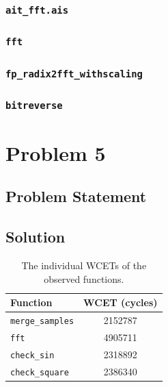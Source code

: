 \documentclass[12pt,a4paper,titlepage,oneside]{article}
\begin{document}
\subsubsection{\texttt{ait\_fft.ais}}



\subsubsection{\texttt{fft}}



\subsubsection{\texttt{fp\_radix2fft\_withscaling}}



\subsubsection{\texttt{bitreverse}}




\newpage
\section{Problem 5}

\subsection{Problem Statement}


\subsection{Solution}


\begin{table}[!ht]
\centering
\begin{tabular}{l|c}
\hline
Function & WCET (cycles)\\
\hline
\texttt{merge\_samples} & 2152787 \\
\texttt{fft} & 4905711 \\
\texttt{check\_sin} & 2318892\\
\texttt{check\_square} & 2386340\\
\hline
\end{tabular}
\caption{The individual WCETs of the observed functions.}
\label{tab:wcetall}
\end{table}
\end{document}
